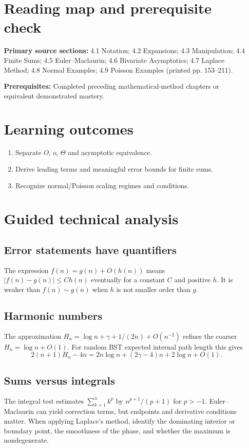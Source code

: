 \documentclass[11pt]{article}
\begin{document}
\makedoctocpage
\section{Reading map and prerequisite check}
\noindent\textbf{Primary source sections:} 4.1 Notation; 4.2 Expansions; 4.3 Manipulation; 4.4 Finite Sums; 4.5 Euler--Maclaurin; 4.6 Bivariate Asymptotics; 4.7 Laplace Method; 4.8 Normal Examples; 4.9 Poisson Examples (printed pp. 153--211).\par
\noindent\textbf{Prerequisites:} Completed preceding mathematical-method chapters or equivalent demonstrated mastery.\par
\section{Learning outcomes}
\begin{enumerate}
\item Separate $O$, $o$, $\Theta$ and asymptotic equivalence.
\item Derive leading terms and meaningful error bounds for finite sums.
\item Recognize normal/Poisson scaling regimes and conditions.
\end{enumerate}
\section{Guided technical analysis}
\subsection{Error statements have quantifiers}
The expression $f(n)=g(n)+O(h(n))$ means $|f(n)-g(n)|\le Ch(n)$ eventually for a constant $C$ and positive $h$. It is weaker than $f(n)\sim g(n)$ when $h$ is not smaller order than $g$.
\subsection{Harmonic numbers}
The approximation $H_n=\log n+\gamma+1/(2n)+O(n^{-2})$ refines the coarser $H_n=\log n+O(1)$. For random BST expected internal path length this gives
\[
2(n+1)H_n-4n=2n\log n+(2\gamma-4)n+2\log n+O(1).
\]
\subsection{Sums versus integrals}
The integral test estimates $\sum_{k=1}^n k^p$ by $n^{p+1}/(p+1)$ for $p>-1$. Euler--Maclaurin can yield correction terms, but endpoints and derivative conditions matter. When applying Laplace's method, identify the dominating interior or boundary point, the smoothness of the phase, and whether the maximum is nondegenerate.
\end{document}
